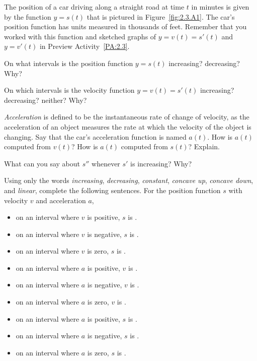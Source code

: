 \begin{activity} \label{A:2.3.1}
The position of a car driving along a straight road at time $t$ in minutes is given by the function $y = s(t)$ that is pictured in Figure~\ref{fig:2.3.A1}.  The car's position function has units measured in thousands of feet.  Remember that you worked with this function and sketched graphs of $y = v(t) = s'(t)$ and $y = v'(t)$ in Preview Activity~\ref{PA:2.3}.

\ba
\item On what intervals is the position function $y = s(t)$ increasing? decreasing?  Why?
\item On which intervals is the velocity function $y = v(t) = s'(t)$ increasing? decreasing? neither?  Why?
\item \emph{Acceleration}  is defined to be the instantaneous rate of change of velocity, as the acceleration of an object measures the rate at which the velocity of the object is changing.  Say that the car's acceleration function is named $a(t)$.  How is $a(t)$ computed from $v(t)$?  How is $a(t)$ computed from $s(t)$?  Explain.
\item What can you say about $s''$ whenever $s'$ is increasing?  Why?
\item Using only the words \emph{increasing}, \emph{decreasing}, \emph{constant}, \emph{concave up}, \emph{concave down}, and \emph{linear}, complete the following sentences.  For the position function $s$ with velocity $v$ and acceleration $a$,
	\begin{itemize}
		\item on an interval where $v$ is positive, $s$ is \underline{\hspace{1.5in}}.
		\item on an interval where $v$ is negative, $s$ is \underline{\hspace{1.5in}}. 
		\item on an interval where $v$ is zero, $s$ is \underline{\hspace{1.5in}}.

		\item on an interval where $a$ is positive, $v$ is \underline{\hspace{1.5in}}.
		\item on an interval where $a$ is negative, $v$ is \underline{\hspace{1.5in}}. 
		\item on an interval where $a$ is zero, $v$ is \underline{\hspace{1.5in}}.

		\item on an interval where $a$ is positive, $s$ is \underline{\hspace{1.5in}}.
		\item on an interval where $a$ is negative, $s$ is \underline{\hspace{1.5in}}. 
		\item on an interval where $a$ is zero, $s$ is \underline{\hspace{1.5in}}.
	\end{itemize}
\ea

\end{activity}

